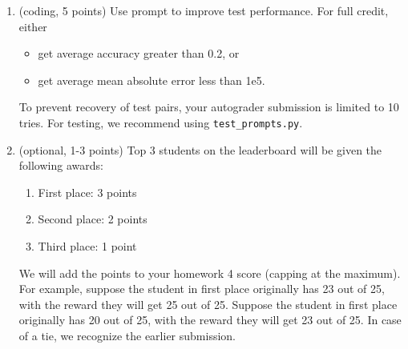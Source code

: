 \documentclass{article}
\theoremstyle{case}
\theoremstyle{definition}
\begin{document}
\begin{enumerate}[label=\alph*.]
    \item (coding, 5 points) Use prompt to improve test performance. For full credit, either
    \begin{itemize}
        \item get average accuracy greater than 0.2, or
        \item get average mean absolute error less than 1e5.
    \end{itemize}
    To prevent recovery of test pairs, your autograder submission is limited to 10 tries. For testing, we recommend using \texttt{test\_prompts.py}.
    \item (optional, 1-3 points)
    Top 3 students on the leaderboard will be given the following awards:
    \begin{enumerate}
        \item First place: 3 points
        \item Second place: 2 points
        \item Third place: 1 point
    \end{enumerate}
    We will add the points to your homework 4 score (capping at the maximum). For example, suppose the student in first place originally has 23 out of 25, with the reward they will get 25 out of 25. Suppose the student in first place originally has 20 out of 25, with the reward they will get 23 out of 25. In case of a tie, we recognize the earlier submission.
\end{enumerate}
\end{document}
